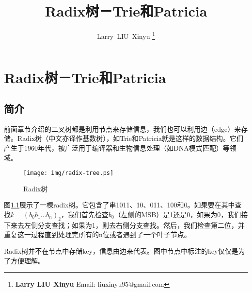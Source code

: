 \documentclass[UTF8]{article}
\begin{document}


\title{Radix树－Trie和Patricia}

\author{Larry~LIU~Xinyu
\thanks{{\bfseries Larry LIU Xinyu } \newline
  Email: liuxinyu95@gmail.com \newline}
  }

\maketitle
\fi


\ifx\wholebook\relax
\chapter{Radix树－Trie和Patricia}
\fi



\section{简介}
\label{introduction}

前面章节介绍的二叉树都是利用节点来存储信息，我们也可以利用边（edge）来存储。Radix树（中文亦译作基数树），如Trie和Patricia就是这样的数据结构。它们产生于1960年代，被广泛用于编译器\cite{okasaki-int-map}和生物信息处理（如DNA模式匹配）\cite{wiki-suffix-tree}等领域。

\begin{figure}[htbp]
  \centering
  \texttt{[image: img/radix-tree.ps]}
  \caption{Radix树} \label{fig:radix-tree}
\end{figure}

图\ref{fig:radix-tree}展示了一棵radix树\cite{CLRS}。它包含了串1011、10、011、100和0。如果要在其中查找$k=(b_0b_1...b_n)_2$，我们首先检查$b_0$（左侧的MSB）是1还是0，如果为0，我们接下来去左侧分支查找；如果为1，则去右侧分支查找。然后，我们检查第二位，并重复这一过程直到处理完所有的n位或者遇到了一个叶子节点。

Radix树并不在节点中存储key，信息由边来代表。图中节点中标注的key仅仅是为了方便理解。
\end{document}
